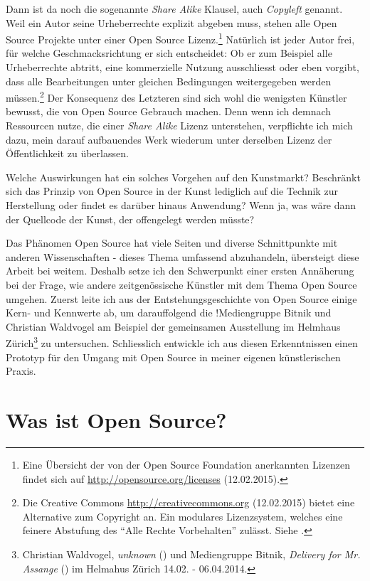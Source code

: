 \documentclass[
paper=164mm:234mm, %
pagesize, %
DIV=calc, %
10pt, %
parskip=half- %
]{scrbook}
\begin{document}
Dann ist da noch die sogenannte \emph{Share Alike} Klausel, auch \emph{Copyleft} genannt. Weil ein Autor seine Urheberrechte explizit abgeben muss, stehen alle Open Source Projekte unter einer Open Source Lizenz.\footnote{Eine Übersicht der von der Open Source Foundation anerkannten Lizenzen findet sich auf \url{http://opensource.org/licenses} (12.02.2015).} Natürlich ist jeder Autor frei, für welche Geschmacksrichtung er sich entscheidet: Ob er zum Beispiel alle Urheberrechte abtritt, eine kommerzielle Nutzung ausschliesst oder eben vorgibt, dass alle Bearbeitungen unter gleichen Bedingungen weitergegeben werden müssen.\footnote{Die Creative Commons \url{http://creativecommons.org} (12.02.2015) bietet eine Alternative zum Copyright an. Ein modulares Lizenzsystem, welches eine feinere Abstufung des \enquote{Alle Rechte Vorbehalten} zulässt. Siehe \cite[7-8]{Casserly-Ito:2011}.} Der Konsequenz des Letzteren sind sich wohl die wenigsten Künstler bewusst, die von Open Source Gebrauch machen. Denn wenn ich demnach Ressourcen nutze, die einer \emph{Share Alike} Lizenz unterstehen, verpflichte ich mich dazu, mein darauf aufbauendes Werk wiederum unter derselben Lizenz der Öffentlichkeit zu überlassen.

Welche Auswirkungen hat ein solches Vorgehen auf den Kunstmarkt? Beschränkt sich das Prinzip von Open Source in der Kunst lediglich auf die Technik zur Herstellung oder findet es darüber hinaus Anwendung? Wenn ja, was wäre dann der Quellcode der Kunst, der offengelegt werden müsste?

Das Phänomen Open Source hat viele Seiten und diverse Schnittpunkte mit anderen Wissenschaften - dieses Thema umfassend abzuhandeln, übersteigt diese Arbeit bei weitem. Deshalb setze ich den Schwerpunkt einer ersten Annäherung bei der Frage, wie andere zeitgenössische Künstler mit dem Thema Open Source umgehen. Zuerst leite ich aus der Entstehungsgeschichte von Open Source einige Kern- und Kennwerte ab, um darauffolgend die !Mediengruppe Bitnik und Christian Waldvogel am Beispiel der gemeinsamen Ausstellung im Helmhaus Zürich\footnote{Christian Waldvogel, \emph{unknown} (\cite{Waldvogel:2014}) und Mediengruppe Bitnik, \emph{Delivery for Mr. Assange} (\cite{Ryser/MediengruppeBitnik:2014}) im Helmahus Zürich 14.02. - 06.04.2014.} zu untersuchen. Schliesslich entwickle ich aus diesen Erkenntnissen einen Prototyp für den Umgang mit Open Source in meiner eigenen künstlerischen Praxis.


{}
\chapter*{Was ist Open Source?}
\end{document}
